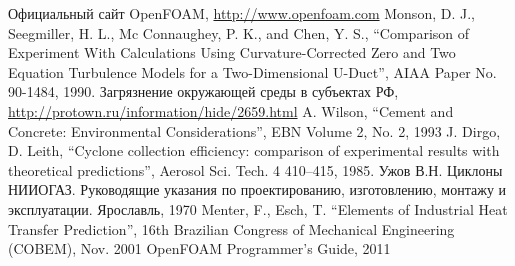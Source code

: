 \documentclass[pdftex,a4paper,12pt]{article}
\begin{document}
\newpage
\begin{thebibliography}{9}

 Официальный сайт OpenFOAM, \url{http://www.openfoam.com}
 Monson, D. J., Seegmiller, H. L., Mc Connaughey, P. K., and Chen, Y. S., “Comparison of Experiment With Calculations Using Curvature-Corrected Zero and Two Equation Turbulence Models for a Two-Dimensional U-Duct”, AIAA Paper No. 90-1484, 1990.
 Загрязнение окружающей среды в субъектах РФ, \url{http://protown.ru/information/hide/2659.html}
 A. Wilson, “Cement and Concrete: Environmental Considerations”, EBN Volume 2, No. 2, 1993
 J. Dirgo, D. Leith, “Cyclone collection efficiency: comparison of experimental results with theoretical predictions”, Aerosol Sci. Tech. 4 410–415, 1985.
 Ужов В.Н. Циклоны НИИОГАЗ. Руководящие указания по проектированию, изготовлению, монтажу и эксплуатации. Ярославль, 1970
 Menter, F., Esch, T. “Elements of Industrial Heat Transfer Prediction”, 16th Brazilian Congress of Mechanical Engineering (COBEM), Nov. 2001
 OpenFOAM Programmer’s Guide, 2011
\end{thebibliography}
\end{document}
